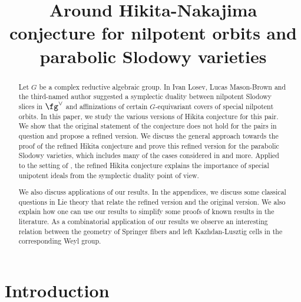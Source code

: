 \documentclass[12pt]{amsart}
\title[Hikita conjecture for nilpotent orbits and parabolic Slodowy varieties]{Around Hikita-Nakajima conjecture for nilpotent orbits and parabolic Slodowy varieties}
\begin{document}
\begin{abstract}
Let $G$ be a complex reductive algebraic group. In \cite{LMBM} Ivan Losev, Lucas Mason-Brown and the third-named author suggested a symplectic duality between nilpotent Slodowy slices in $\fg^\vee$ and affinizations of certain $G$-equivariant covers of special nilpotent orbits. In this paper, we study the various versions of Hikita conjecture for this pair. We show that the original statement of the conjecture does not hold for the pairs in question and propose a refined version. We discuss the general approach towards the proof of the refined Hikita conjecture 
and prove this refined version for the parabolic Slodowy varieties, which includes many of the cases considered in \cite{LMBM} and more. Applied to the setting of \cite{LMBM}, the refined Hikita conjecture explains the importance of special unipotent ideals from the symplectic duality point of view.

We also discuss applications of our results. 
In the appendices, we discuss some classical questions in Lie theory that relate the refined version and the original version. We also explain how one can use our results to simplify some proofs of known results in the literature. As a combinatorial application of our results we observe an interesting relation between the geometry of Springer fibers and left Kazhdan-Lusztig cells in the corresponding Weyl group.
\end{abstract}

\maketitle


\section{Introduction}
\end{document}
